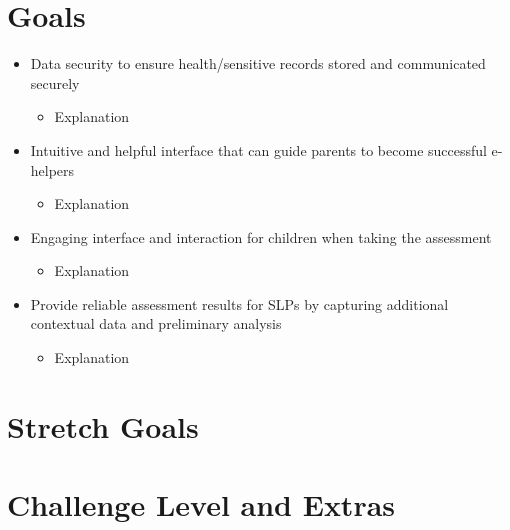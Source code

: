 \documentclass{article}
\begin{document}
\section{Goals}
\begin{itemize}
    \item Data security to ensure health/sensitive records stored and communicated securely
    \begin{itemize}
        \item Explanation
    \end{itemize}
    
    \item Intuitive and helpful interface that can guide parents to become successful e-helpers
    \begin{itemize}
        \item Explanation
    \end{itemize}
    
    \item Engaging interface and interaction for children when taking the assessment
    \begin{itemize}
        \item Explanation
    \end{itemize}
    
    \item Provide reliable assessment results for SLPs by capturing additional contextual data and preliminary analysis
    \begin{itemize}
        \item Explanation
    \end{itemize}

\end{itemize}


\section{Stretch Goals}

\section{Challenge Level and Extras}

\end{document}
